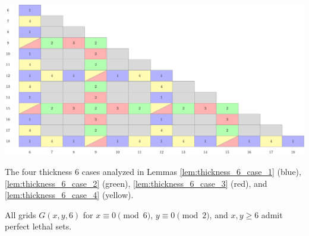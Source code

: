 


\begin{table}[]
\centering
\includegraphics[width=\textwidth]{tables/4/thickness_6_cases.pdf}
\caption{The four thickness 6 cases analyzed in Lemmas \ref{lem:thickness_6_case_1} (blue), \ref{lem:thickness_6_case_2} (green), \ref{lem:thickness_6_case_3} (red), and \ref{lem:thickness_6_case_4} (yellow).}
\label{fig:thickness_6_cases}
\end{table}

\begin{lem}
\label{lem:thickness_6_case_1}
All grids $G(x,y,6)$ for $x \equiv 0 \pmod 6$, $y \equiv 0 \pmod 2$, and $x,y \geq 6$ admit perfect lethal sets.
\end{lem}

